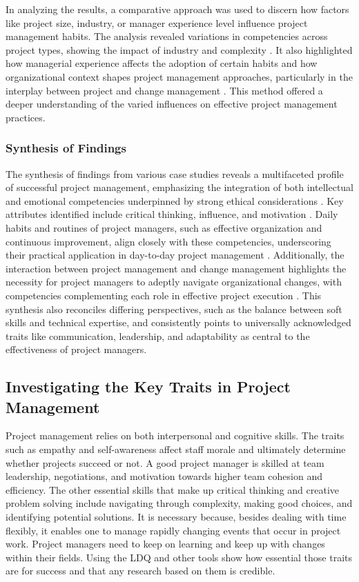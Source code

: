 \documentclass{article}
\begin{document}
In analyzing the results, a comparative approach was used to discern how factors like project size, industry, or manager experience level influence project management habits. The analysis revealed variations in competencies across project types, showing the impact of industry and complexity \cite{muller2010leadership}. It also highlighted how managerial experience affects the adoption of certain habits \cite{sigurdhssonpatterns} and how organizational context shapes project management approaches, particularly in the interplay between project and change management \cite{pollack2016project}. This method offered a deeper understanding of the varied influences on effective project management practices.

\subsubsection{Synthesis of Findings}

The synthesis of findings from various case studies reveals a multifaceted profile of successful project management, emphasizing the integration of both intellectual and emotional competencies underpinned by strong ethical considerations \cite{bredillet2015good}. Key attributes identified include critical thinking, influence, and motivation \cite{muller2010leadership}. Daily habits and routines of project managers, such as effective organization and continuous improvement, align closely with these competencies, underscoring their practical application in day-to-day project management \cite{sigurdhssonpatterns}. Additionally, the interaction between project management and change management highlights the necessity for project managers to adeptly navigate organizational changes, with competencies complementing each role in effective project execution \cite{pollack2016project}. This synthesis also reconciles differing perspectives, such as the balance between soft skills and technical expertise, and consistently points to universally acknowledged traits like communication, leadership, and adaptability as central to the effectiveness of project managers.


\subsection{Investigating the Key Traits in Project Management}
Project management relies on both interpersonal and cognitive skills. The traits such as empathy and self-awareness affect staff morale and ultimately determine whether projects succeed or not. A good project manager is skilled at team leadership, negotiations, and motivation towards higher team cohesion and efficiency. The other essential skills that make up critical thinking and creative problem solving include navigating through complexity, making good choices, and identifying potential solutions. It is necessary because, besides dealing with time flexibly, it enables one to manage rapidly changing events that occur in project work. Project managers need to keep on learning and keep up with changes within their fields. Using the LDQ and other tools show how essential those traits are for success and that any research based on them is credible.\cite{muller2010leadership}
\end{document}
